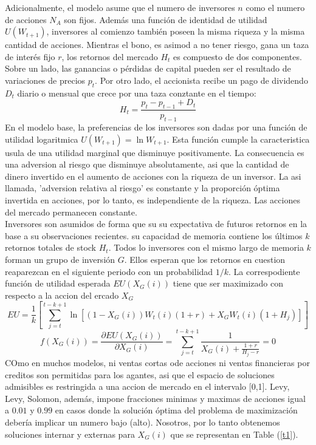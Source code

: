 \documentclass[12pt,a4paper]{article}
\begin{document}
\quad Adicionalmente, el modelo asume que el numero de inversores $n$ como el numero de acciones $N_A$ son fijos. Además una función de identidad de utilidad $U(W_{t+1})$, inversores al comienzo también poseen la misma riqueza y la misma cantidad de acciones. Mientras el bono, es asimod a no tener riesgo, gana un taza de interés fijo $r$, los retornos del mercado $H_t$ es compuesto de dos componentes. Sobre un lado, las ganancias o pérdidas de capital pueden ser el resultado de variaciones de precios $p_t$. Por otro lado, el accionista recibe un pago de dividendo $D_t$ diario o mensual que crece por una taza conztante en el tiempo:
\begin{equation}
H_t=\frac{p_t-p_{t-1}+D_t}{p_{t-1}}
\end{equation} 
\quad En el modelo base, la preferencias de los inversores son dadas por una función de utilidad logaritmica $U(W_{t+1})=\ln{W_{t+1}}$. Esta función cumple la caracteristica usula de una utilidad marginal que disminuye positivamente. La consecuencia es una adversion al riesgo que disminuye absolutamente, asi que la cantidad de dinero invertido en el aumento de acciones con la riqueza de un inversor. La asi llamada, 'adversion relativa al riesgo' es constante y la proporción óptima invertida en acciones, por lo tanto, es independiente de la riqueza. Las acciones del mercado permanecen constante.\\
\quad Inversores son asumidos de forma que su su expectativa de futuros retornos en la base a su observaciones recientes. su capacidad de memoria contiene los últimos $k$ retornos totales de stock $H_t$. Todos lo inversores con el mismo largo de memoria $k$ forman un grupo de inversión $G$. Ellos esperan que los retornos en cuestion reaparezcan en el siguiente periodo con un probabilidad $1/k$. La correspodiente función de utilidad esperada $EU(X_{G}(i))$ tiene que ser maximizado con respecto a la accion del ercado $X_G$
\begin{equation}
EU = \frac{1}{k}\left[ \sum^{t-k+1}_{j=t}\ln[(1-X_{G}(i))W_t(i)(1+r)+X_GW_t(i)(1+H_j)]\right]
\end{equation}
\begin{equation}
f(X_G(i))=\frac{\partial EU(X_G(i))}{\partial X_G(i)}= \sum^{t-k+1}_{j=t}\frac{1}{X_G(i)+\frac{1+r}{H_j-r}}=0
\end{equation}
\quad COmo en muchos modelos, ni ventas cortas ode acciones ni ventas financieras por creditos son permitidas para los agantes, asi que el espacio de soluciones admisibles es restringida a una accion de mercado en el intervalo [0,1]. Levy, Levy, Solomon, además, impone fracciones minimas y maximas de acciones igual a $0.01$ y $0.99$ en casos donde la solución óptima del problema de maximización debería implicar un numero bajo (alto). Nosotros, por lo tanto obtenemos soluciones internar y externas para $X_G(i)$ que se representan en Table (\ref{t1}).
\end{document}
